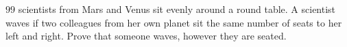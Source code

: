 $99$ scientists from Mars and Venus sit evenly around a round table. A scientist waves if two colleagues from her own planet sit the same number of seats to her left and right. Prove that someone waves, however they are seated.
